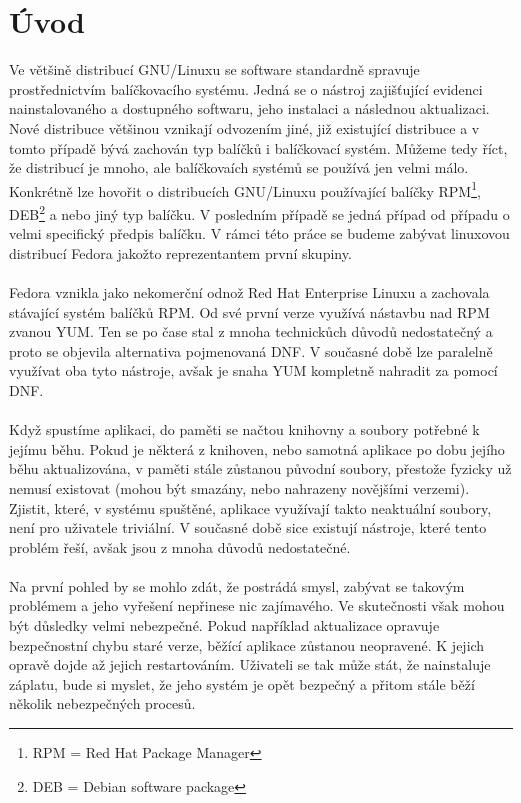\documentclass[
  field=inf,
  biblatex,
  glossaries,
  index
]{kidiplom}
\begin{document}
\section{Úvod}
	Ve většině distribucí GNU/Linuxu se software standardně spravuje prostřednictvím balíčkovacího systému. Jedná se o nástroj zajišťující evidenci nainstalovaného a dostupného softwaru, jeho instalaci a následnou aktualizaci. Nové distribuce většinou vznikají odvozením jiné, již existující distribuce a v tomto případě bývá zachován typ balíčků i balíčkovací systém. Můžeme tedy říct, že distribucí je mnoho, ale balíčkovaích systémů se používá jen velmi málo. Konkrétně lze hovořit o distribucích GNU/Linuxu používající balíčky RPM\footnote{RPM = Red Hat Package Manager}, DEB\footnote{DEB = Debian software package} a nebo jiný typ balíčku. V posledním případě se jedná případ od případu o velmi specifický předpis balíčku. V rámci této práce se budeme zabývat linuxovou distribucí Fedora jakožto reprezentantem první skupiny.
	\\
	\\
	Fedora vznikla jako nekomerční odnož Red Hat Enterprise Linuxu a zachovala stávající systém balíčků RPM\@. Od své první verze využívá nástavbu nad RPM zvanou YUM\@. Ten se po čase stal z mnoha technickůch důvodů nedostatečný a proto se objevila alternativa pojmenovaná DNF\@. V současné době lze paralelně využívat oba tyto nástroje, avšak je snaha YUM kompletně nahradit za pomocí DNF\@.
	\\
	\\
	Když spustíme aplikaci, do paměti se načtou knihovny a soubory potřebné k jejímu běhu. Pokud je některá z knihoven, nebo samotná aplikace po dobu jejího běhu aktualizována, v paměti stále zůstanou původní soubory, přestože fyzicky už nemusí existovat (mohou být smazány, nebo nahrazeny novějšími verzemi).
	\\
	Zjistit, které, v systému spuštěné, aplikace využívají takto neaktuální soubory, není pro uživatele triviální. V současné době sice existují nástroje, které tento problém řeší, avšak jsou z mnoha důvodů nedostatečné.
	\\
	\\
	Na první pohled by se mohlo zdát, že postrádá smysl, zabývat se takovým problémem a jeho vyřešení nepřinese nic zajímavého. Ve skutečnosti však mohou být důsledky velmi nebezpečné. Pokud například aktualizace opravuje bezpečnostní chybu staré verze, běžící aplikace zůstanou neopravené. K jejich opravě dojde až jejich restartováním. Uživateli se tak může stát, že nainstaluje záplatu, bude si myslet, že jeho systém je opět bezpečný a přitom stále běží několik nebezpečných procesů.
\end{document}
